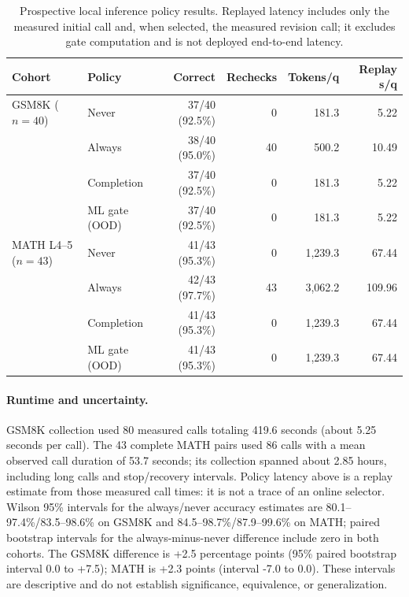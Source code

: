 \documentclass[conference]{IEEEtran}
\begin{document}
\begin{table}[t]
\centering
\caption{Prospective local inference policy results. Replayed latency includes only the measured initial call and, when selected, the measured revision call; it excludes gate computation and is not deployed end-to-end latency.}
\label{tab:local-results}
\scriptsize
\setlength{\tabcolsep}{2.5pt}
\begin{tabularx}{\columnwidth}{llrrrr}
\toprule
Cohort & Policy & Correct & Rechecks & Tokens/q & Replay s/q \\
\midrule
GSM8K ($n=40$) & Never & 37/40 (92.5\%) & 0 & 181.3 & 5.22 \\
 & Always & 38/40 (95.0\%) & 40 & 500.2 & 10.49 \\
 & Completion & 37/40 (92.5\%) & 0 & 181.3 & 5.22 \\
 & ML gate (OOD) & 37/40 (92.5\%) & 0 & 181.3 & 5.22 \\
\midrule
MATH L4--5 ($n=43$) & Never & 41/43 (95.3\%) & 0 & 1,239.3 & 67.44 \\
 & Always & 42/43 (97.7\%) & 43 & 3,062.2 & 109.96 \\
 & Completion & 41/43 (95.3\%) & 0 & 1,239.3 & 67.44 \\
 & ML gate (OOD) & 41/43 (95.3\%) & 0 & 1,239.3 & 67.44 \\
\bottomrule
\end{tabularx}
\end{table}

\paragraph{Runtime and uncertainty.} GSM8K collection used 80 measured calls totaling 419.6 seconds (about 5.25 seconds per call). The 43 complete MATH pairs used 86 calls with a mean observed call duration of 53.7 seconds; its collection spanned about 2.85 hours, including long calls and stop/recovery intervals. Policy latency above is a replay estimate from those measured call times: it is not a trace of an online selector. Wilson 95\% intervals for the always/never accuracy estimates are 80.1--97.4\%/83.5--98.6\% on GSM8K and 84.5--98.7\%/87.9--99.6\% on MATH; paired bootstrap intervals for the always-minus-never difference include zero in both cohorts. The GSM8K difference is +2.5 percentage points (95\% paired bootstrap interval 0.0 to +7.5); MATH is +2.3 points (interval -7.0 to 0.0). These intervals are descriptive and do not establish significance, equivalence, or generalization.
\end{document}

